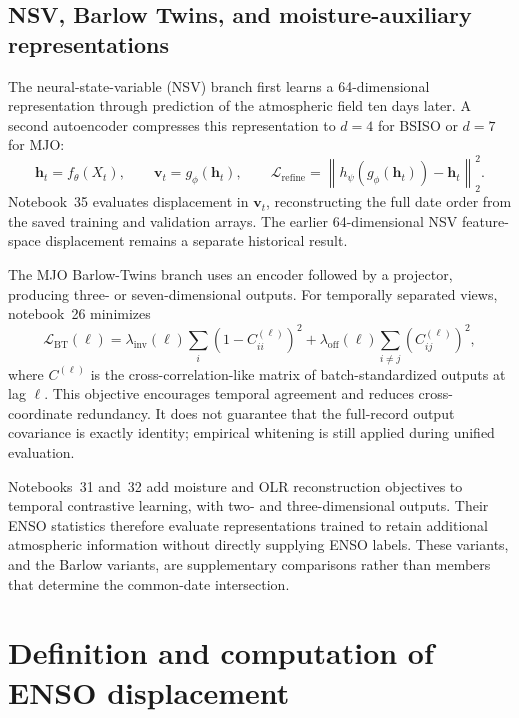 \documentclass[11pt]{article}
\begin{document}
\subsection{NSV, Barlow Twins, and moisture-auxiliary representations}

The neural-state-variable (NSV) branch first learns a 64-dimensional representation through prediction of the atmospheric field ten days later. A second autoencoder compresses this representation to $d=4$ for BSISO or $d=7$ for MJO:
\begin{equation}
\mathbf h_t=f_\theta(X_t),\qquad
\mathbf v_t=g_\phi(\mathbf h_t),\qquad
\mathcal L_{\mathrm{refine}}=
\left\|h_\psi(g_\phi(\mathbf h_t))-\mathbf h_t\right\|_2^2.
\end{equation}
Notebook~35 evaluates displacement in $\mathbf v_t$, reconstructing the full date order from the saved training and validation arrays. The earlier 64-dimensional NSV feature-space displacement remains a separate historical result.

The MJO Barlow-Twins branch uses an encoder followed by a projector, producing three- or seven-dimensional outputs. For temporally separated views, notebook~26 minimizes
\begin{equation}
\mathcal L_{\mathrm{BT}}(\ell)=
\lambda_{\mathrm{inv}}(\ell)\sum_i(1-C_{ii}^{(\ell)})^2+
\lambda_{\mathrm{off}}(\ell)\sum_{i\ne j}(C_{ij}^{(\ell)})^2,
\end{equation}
where $C^{(\ell)}$ is the cross-correlation-like matrix of batch-standardized outputs at lag $\ell$. This objective encourages temporal agreement and reduces cross-coordinate redundancy. It does not guarantee that the full-record output covariance is exactly identity; empirical whitening is still applied during unified evaluation.

Notebooks~31 and~32 add moisture and OLR reconstruction objectives to temporal contrastive learning, with two- and three-dimensional outputs. Their ENSO statistics therefore evaluate representations trained to retain additional atmospheric information without directly supplying ENSO labels. These variants, and the Barlow variants, are supplementary comparisons rather than members that determine the common-date intersection.

\section{Definition and computation of ENSO displacement}
\label{sec:statistic}
\end{document}
